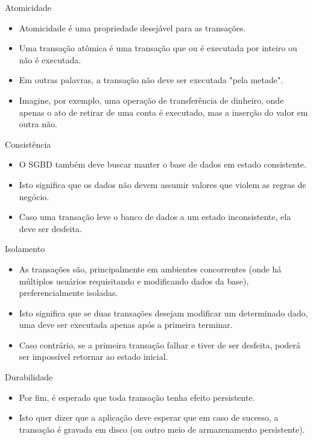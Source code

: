 \documentclass[11pt]{beamer}
\begin{document}
\begin{frame}{Atomicidade}
    \begin{itemize}
        \item Atomicidade é uma propriedade desejável para as transações.
        \item Uma transação atômica é uma transação que ou é executada por inteiro ou não é executada.
        \item Em outras palavras, a transação não deve ser executada "pela metade".
        \item Imagine, por exemplo, uma operação de transferência de dinheiro, onde apenas o ato de retirar de uma conta é executado, mas a inserção do valor em outra não.
    \end{itemize}
\end{frame}

\begin{frame}{Consistência}
    \begin{itemize}
        \item O SGBD também deve buscar manter o base de dados em estado consistente.
        \item Isto significa que os dados não devem assumir valores que violem as regras de negócio.
        \item Caso uma transação leve o banco de dados a um estado inconsistente, ela deve ser desfeita.
    \end{itemize}
\end{frame}

\begin{frame}{Isolamento}
    \begin{itemize}
        \item As transações são, principalmente em ambientes concorrentes (onde há múltiplos usuários requisitando e modificando dados da base), preferencialmente isoladas.
        \item Isto significa que se duas transações desejam modificar um determinado dado, uma deve ser executada apenas após a primeira terminar.
        \item Caso contrário, se a primeira transação falhar e tiver de ser desfeita, poderá ser impossível retornar ao estado inicial.
    \end{itemize}
\end{frame}

\begin{frame}{Durabilidade}
    \begin{itemize}
        \item Por fim, é esperado que toda transação tenha efeito persistente.
        \item Isto quer dizer que a aplicação deve esperar que em caso de sucesso, a transação é gravada em disco (ou outro meio de armazenamento persistente).
    \end{itemize}
\end{frame}
\end{document}
